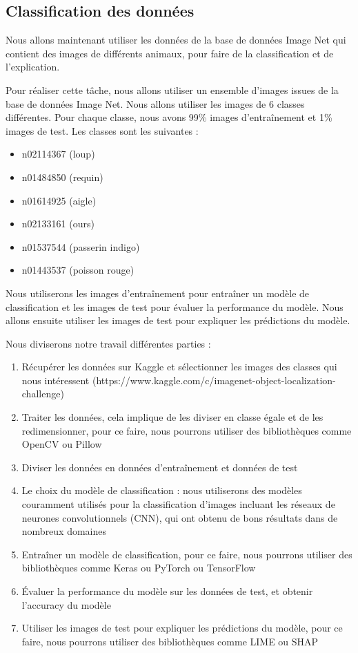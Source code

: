 


\subsection{Classification des données}

Nous allons maintenant utiliser les données de la base de données Image Net qui contient des images de différents animaux, pour faire de la classification et de l'explication.


Pour réaliser cette tâche, nous allons utiliser un ensemble d'images issues de la base de données Image Net. Nous allons utiliser les images de 6 classes différentes. Pour chaque classe, nous avons 99\% images d'entraînement et 1\% images de test. Les classes sont les suivantes :


\begin{itemize}
    \item n02114367 (loup)
    \item n01484850 (requin)
    \item n01614925 (aigle)
    \item n02133161 (ours)
    \item n01537544 (passerin indigo)
    \item n01443537 (poisson rouge)
\end{itemize}


Nous utiliserons les images d'entraînement pour entraîner un modèle de classification et les images de test pour évaluer la performance du modèle. Nous allons ensuite utiliser les images de test pour expliquer les prédictions du modèle.


Nous diviserons notre travail différentes parties :

\begin{enumerate}
    \item Récupérer les données sur Kaggle et sélectionner les images des classes qui nous intéressent (https://www.kaggle.com/c/imagenet-object-localization-challenge)
    \item Traiter les données, cela implique de les diviser en classe égale et de les redimensionner, pour ce faire, nous pourrons utiliser des bibliothèques comme OpenCV ou Pillow
    \item Diviser les données en données d'entraînement et données de test
    \item Le choix du modèle de classification : nous utiliserons des modèles couramment utilisés pour la classification d'images incluant les réseaux de neurones convolutionnels (CNN), qui ont obtenu de bons résultats dans de nombreux domaines
    \item Entraîner un modèle de classification, pour ce faire, nous pourrons utiliser des bibliothèques comme Keras ou PyTorch ou TensorFlow
    \item Évaluer la performance du modèle sur les données de test, et obtenir l'accuracy du modèle
    \item Utiliser les images de test pour expliquer les prédictions du modèle, pour ce faire, nous pourrons utiliser des bibliothèques comme LIME ou SHAP
\end{enumerate}

